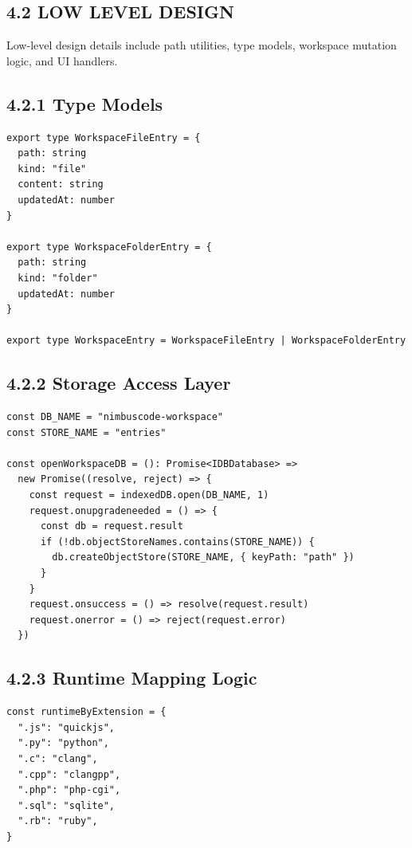 \subsection{4.2 LOW LEVEL DESIGN}
Low-level design details include path utilities, type models, workspace mutation logic, and UI handlers.

\subsection*{4.2.1 Type Models}
\begin{lstlisting}[style=javascriptstyle,caption={Type Models for Workspace Entries}]
export type WorkspaceFileEntry = {
  path: string
  kind: "file"
  content: string
  updatedAt: number
}

export type WorkspaceFolderEntry = {
  path: string
  kind: "folder"
  updatedAt: number
}

export type WorkspaceEntry = WorkspaceFileEntry | WorkspaceFolderEntry
\end{lstlisting}

\subsection*{4.2.2 Storage Access Layer}
\begin{lstlisting}[style=javascriptstyle,caption={IndexedDB Access Pattern}]
const DB_NAME = "nimbuscode-workspace"
const STORE_NAME = "entries"

const openWorkspaceDB = (): Promise<IDBDatabase> =>
  new Promise((resolve, reject) => {
    const request = indexedDB.open(DB_NAME, 1)
    request.onupgradeneeded = () => {
      const db = request.result
      if (!db.objectStoreNames.contains(STORE_NAME)) {
        db.createObjectStore(STORE_NAME, { keyPath: "path" })
      }
    }
    request.onsuccess = () => resolve(request.result)
    request.onerror = () => reject(request.error)
  })
\end{lstlisting}

\subsection*{4.2.3 Runtime Mapping Logic}
\begin{lstlisting}[style=javascriptstyle,caption={Extension to Runtime Mapping}]
const runtimeByExtension = {
  ".js": "quickjs",
  ".py": "python",
  ".c": "clang",
  ".cpp": "clangpp",
  ".php": "php-cgi",
  ".sql": "sqlite",
  ".rb": "ruby",
}
\end{lstlisting}

